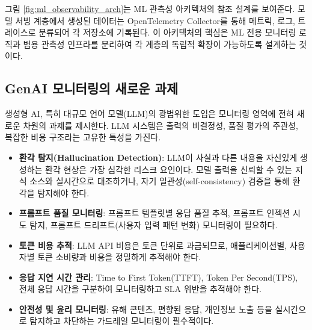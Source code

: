 그림 \ref{fig:ml_observability_arch}는 ML 관측성 아키텍처의 참조 설계를 보여준다. 모델 서빙 계층에서 생성된 데이터는 OpenTelemetry Collector를 통해 메트릭, 로그, 트레이스로 분류되어 각 저장소에 기록된다. 이 아키텍처의 핵심은 ML 전용 모니터링 로직과 범용 관측성 인프라를 분리하여 각 계층의 독립적 확장이 가능하도록 설계하는 것이다.

\subsection{GenAI 모니터링의 새로운 과제}
\label{sec:14.3.4}

생성형 AI, 특히 대규모 언어 모델(LLM)의 광범위한 도입은 모니터링 영역에 전혀 새로운 차원의 과제를 제시한다. LLM 시스템은 출력의 비결정성, 품질 평가의 주관성, 복잡한 비용 구조라는 고유한 특성을 가진다\cite{bommasani2021opportunities}.

\begin{itemize}
    \item \textbf{환각 탐지(Hallucination Detection)}: LLM이 사실과 다른 내용을 자신있게 생성하는 환각 현상은 가장 심각한 리스크 요인이다. 모델 출력을 신뢰할 수 있는 지식 소스와 실시간으로 대조하거나, 자기 일관성(self-consistency) 검증을 통해 환각을 탐지해야 한다.
    \item \textbf{프롬프트 품질 모니터링}: 프롬프트 템플릿별 응답 품질 추적, 프롬프트 인젝션 시도 탐지, 프롬프트 드리프트(사용자 입력 패턴 변화) 모니터링이 필요하다.
    \item \textbf{토큰 비용 추적}: LLM API 비용은 토큰 단위로 과금되므로, 애플리케이션별, 사용자별 토큰 소비량과 비용을 정밀하게 추적해야 한다.
    \item \textbf{응답 지연 시간 관리}: Time to First Token(TTFT), Token Per Second(TPS), 전체 응답 시간을 구분하여 모니터링하고 SLA 위반을 추적해야 한다.
    \item \textbf{안전성 및 윤리 모니터링}: 유해 콘텐츠, 편향된 응답, 개인정보 노출 등을 실시간으로 탐지하고 차단하는 가드레일 모니터링이 필수적이다\cite{openai2023gpt4}.
\end{itemize}

